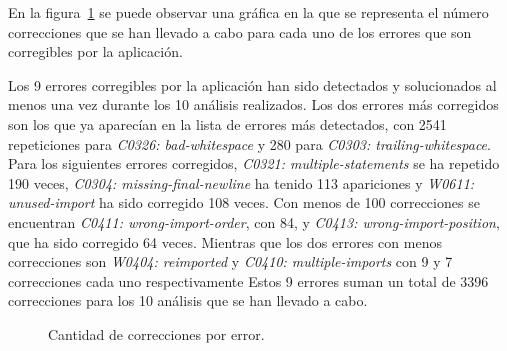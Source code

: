 \documentclass[a4paper, 12pt]{book}
\begin{document}
En la figura~\ref{fig:errores_corregidos} se puede observar una gráfica en la que se representa el número correcciones que se han llevado a cabo para cada uno de los errores que son corregibles por la aplicación.

Los 9 errores corregibles por la aplicación han sido detectados y solucionados al menos una vez durante los 10 análisis realizados.
Los dos errores más corregidos son los que ya aparecían en la lista de errores más detectados, con 2541 repeticiones para \textit{C0326: bad-whitespace} y 280 para \textit{C0303: trailing-whitespace}.
Para los siguientes errores corregidos, \textit{C0321: multiple-statements} se ha repetido 190 veces, \textit{C0304: missing-final-newline} ha tenido 113 apariciones y \textit{W0611: unused-import} ha sido corregido 108 veces.
Con menos de 100 correcciones se encuentran \textit{C0411: wrong-import-order}, con 84, y \textit{C0413: wrong-import-position}, que ha sido corregido 64 veces.
Mientras que los dos errores con menos correcciones son \textit{W0404: reimported} y \textit{C0410: multiple-imports} con 9 y 7 correcciones cada uno respectivamente
Estos 9 errores suman un total de 3396 correcciones para los 10 análisis que se han llevado a cabo.
\newline
\begin{figure}[h]
  \centering
  \caption{Cantidad de correcciones por error.}\label{fig:errores_corregidos}
\end{figure}


\end{document}
